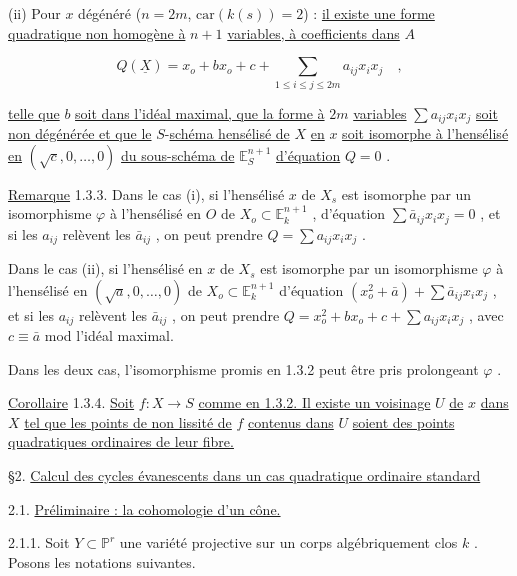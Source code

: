 (ii) Pour $x$ dégénéré ($n = 2m$, $\mathrm{car}(k(s)) = 2$) : \underline{il existe une forme quadratique non homogène à} $n+1$ \underline{variables, à coefficients dans} $A$

\begin{equation}\tag{4.14.2}
Q(\underline{X}) = x_o + b x_o + c + \sum_{1 \leq i \leq j \leq 2m} a_{ij} x_i x_j \quad , 
\end{equation}


 \underline{telle que} $b$ \underline{soit dans l'idéal maximal, que la forme à} $2m$ \underline{variables} $\sum a_{ij} x_i x_j$ \underline{soit non dégénérée et que le} $S$-\underline{schéma hensélisé de} $X$ \underline{en} $x$ \underline{soit isomorphe à l'hensélisé en} $(\sqrt{c},0,\ldots,0)$ \underline{du sous-schéma de} $\mathbb{E}^{n+1}_S$ \underline{d'équation} $Q = 0$ .

\underline{Remarque} 1.3.3. Dans le cas (i), si l'hensélisé $x$ de $X_s$ est isomorphe par un isomorphisme $\varphi$ à l'hensélisé en $O$ de $X_o \subset \mathbb{E}^{n+1}_k$ , d'équation $\sum \bar{a}_{ij} x_i x_j = 0$ , et si les $a_{ij}$ relèvent les $\bar{a}_{ij}$ , on peut prendre $Q = \sum a_{ij} x_i x_j$ .

Dans le cas (ii), si l'hensélisé en $x$ de $X_s$ est isomorphe par un isomorphisme $\varphi$ à l'hensélisé en $(\sqrt{a},0,\ldots,0)$ de $X_o \subset \mathbb{E}^{n+1}_k$ d'équation $(x_o^2 + \bar{a}) + \sum \bar{a}_{ij} x_i x_j$ , et si les $a_{ij}$ relèvent les $\bar{a}_{ij}$ , on peut prendre $Q = x_o^2 + bx_o + c + \sum a_{ij} x_i x_j$ , avec $c \equiv \bar{a}$ mod l'idéal maximal.

Dans les deux cas, l'isomorphisme promis en 1.3.2 peut être pris prolongeant $\varphi$ .

\underline{Corollaire} 1.3.4. \underline{Soit} $f : X \to S$ \underline{comme en 1.3.2. Il existe un voisinage} $U$ \underline{de} $x$ \underline{dans} $X$ \underline{tel que les points de non lissité de} $f$ \underline{contenus dans} $U$ \underline{soient des points quadratiques ordinaires de leur fibre.}




§2. \underline{Calcul des cycles évanescents dans un cas quadratique ordinaire standard}


2.1. \underline{Préliminaire : la cohomologie d'un cône.}

2.1.1. Soit $Y \subset \mathbb{P}^r$ une variété projective sur un corps algébriquement clos $k$ . Posons les notations suivantes.

